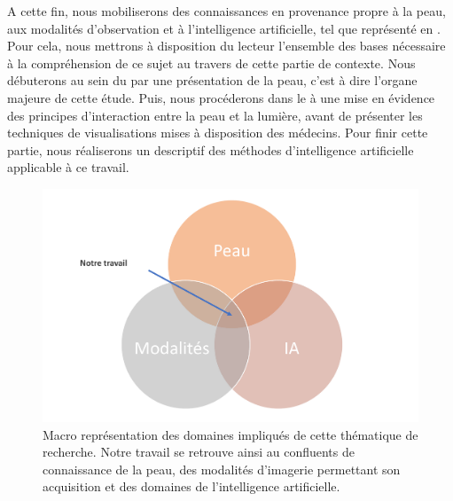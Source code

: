 A cette fin, nous mobiliserons des connaissances en provenance propre à la peau, aux modalités d'observation et à l'intelligence artificielle, tel que représenté en . Pour cela, nous mettrons à disposition du lecteur l'ensemble des bases nécessaire à la compréhension de ce sujet au travers de cette partie de contexte. Nous débuterons au sein du  par une présentation de la peau, c'est à dire l'organe majeure de cette étude. Puis, nous procéderons dans le  à une mise en évidence des principes d'interaction entre la peau et la lumière, avant de présenter les techniques de visualisations mises à disposition des médecins. Pour finir cette partie, nous réaliserons un descriptif des méthodes d'intelligence artificielle applicable à ce travail.\par

\begin{figure}[H]
    \centering
    \includegraphics[width=\linewidth]{contents/ii_preamble_context/resources/scheme_our_work.pdf}
    \caption{Macro représentation des domaines impliqués de cette thématique de recherche. Notre travail se retrouve ainsi au confluents de connaissance de la peau, des modalités d'imagerie permettant son acquisition et des domaines de l'intelligence artificielle.}
    \label{fig:scheme_our_work}
\end{figure}\par


